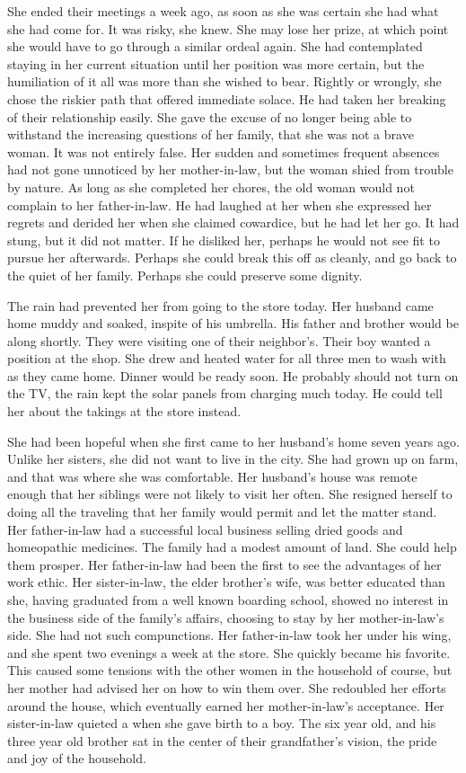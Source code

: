 \documentclass{article}
\begin{document}
She ended their meetings a week ago, as soon as she was certain she had what she had come for. It was risky, she knew. She may lose her prize, at which point she would have to go through a similar ordeal again. She had contemplated staying in her current situation until her position was more certain, but the humiliation of it all was more than she wished to bear. Rightly or wrongly, she chose the riskier path that offered immediate solace. He had taken her breaking of their relationship easily. She gave the excuse of no longer being able to withstand the increasing questions of her family, that she was not a brave woman. It was not entirely false. Her sudden and sometimes frequent absences had not gone unnoticed by her mother-in-law, but the woman shied from trouble by nature. As long as she completed her chores, the old woman would not complain to her father-in-law. He had laughed at her when she expressed her regrets and derided her when she claimed cowardice, but he had let her go. It had stung, but it did not matter. If he disliked her, perhaps he would not see fit to pursue her afterwards. Perhaps she could break this off as cleanly, and go back to the quiet of her family. Perhaps she could preserve some dignity.

The rain had prevented her from going to the store today. Her husband came home muddy and soaked, inspite of his umbrella. His father and brother would be along shortly. They were visiting one of their neighbor's. Their boy wanted a position at the shop. She drew and heated water for all three men to wash with as they came home. Dinner would be ready soon. He probably should not turn on the TV, the rain kept the solar panels from charging much today. He could tell her about the takings at the store instead.

She had been hopeful when she first came to her husband's home seven years ago. Unlike her sisters, she did not want to live in the city. She had grown up on farm, and that was where she was comfortable. Her husband's house was remote enough that her siblings were not likely to visit her often. She resigned herself to doing all the traveling that her family would permit and let the matter stand. Her father-in-law had a successful local business selling dried goods and homeopathic medicines. The family had a modest amount of land. She could help them prosper. Her father-in-law had been the first to see the advantages of her work ethic. Her sister-in-law, the elder brother's wife, was better educated than she, having graduated from a well known boarding school, showed no interest in the business side of the family's affairs, choosing to stay by her mother-in-law's side. She had not such compunctions. Her father-in-law took her under his wing, and she spent two evenings a week at the store. She quickly became his favorite. This caused some tensions with the other women in the household of course, but her mother had advised her on how to win them over. She redoubled her efforts around the house, which eventually earned her mother-in-law's acceptance. Her sister-in-law quieted a when she gave birth to a boy. The six year old, and his three year old brother sat in the center of their grandfather's vision, the pride and joy of the household.
\end{document}

